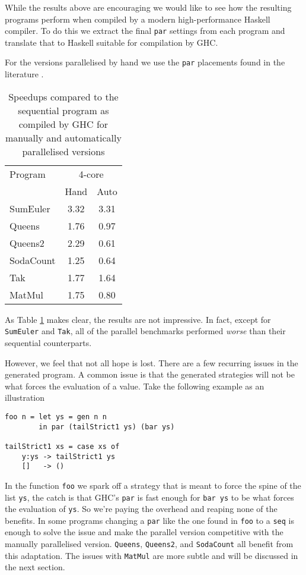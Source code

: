 While the results above are encouraging we would like to see how the resulting
programs perform when compiled by a modern high-performance Haskell compiler.
To do this we extract the final \verb-par- settings from each program and
translate that to Haskell suitable for compilation by GHC.

For the versions parallelised by hand we use the \verb-par- placements found
in the literature \citep{vGMachine, runciman1994profiling}.

\begin{table}[ht]
\caption[Naive transfer to GHC]{Speedups compared to the sequential program as compiled by GHC for
         manually and automatically parallelised versions}
\centering
\smallskip
  \begin{tabular}{ l||c c }
    Program & \multicolumn{2}{c}{4-core} \\
            & Hand   & Auto         \\
    \hline
    SumEuler  & 3.32    & 3.31      \\
    Queens    & 1.76    & 0.97      \\
    Queens2   & 2.29    & 0.61     \\
    SodaCount & 1.25    & 0.64      \\
    Tak       & 1.77    & 1.64      \\
    MatMul    & 1.75    & 0.80      \\
  \end{tabular}
\label{tableGHC}
\end{table}

As Table \ref{tableGHC} makes clear, the results are not impressive. In fact,
except for \verb-SumEuler- and \verb-Tak-, all of the parallel benchmarks
performed \emph{worse} than their sequential counterparts.

However, we feel that not all hope is lost. There are a few recurring issues in
the generated program. A common issue is that the generated strategies will not
be what forces the evaluation of a value. Take the following example as an
illustration

\begin{verbatim}
foo n = let ys = gen n n
        in par (tailStrict1 ys) (bar ys)

tailStrict1 xs = case xs of
    y:ys -> tailStrict1 ys
    []   -> ()
\end{verbatim}

In the function \verb-foo- we spark off a strategy that is meant to force the
spine of the list \verb-ys-, the catch is that GHC's \verb-par- is fast enough
for \verb-bar ys- to be what forces the evaluation of \verb-ys-. So we're
paying the overhead and reaping none of the benefits. In some programs changing
a \verb-par- like the one found in \verb-foo- to a \verb-seq- is enough to
solve the issue and make the parallel version competitive with the manually
parallelised version.  \verb|Queens|, \verb|Queens2|, and \verb|SodaCount| all
benefit from this adaptation. The issues with \verb|MatMul| are more subtle and
will be discussed in the next section.
